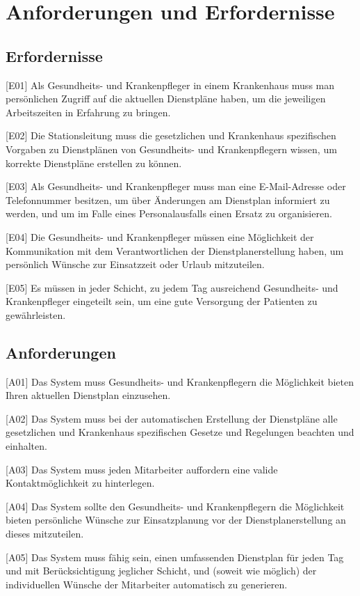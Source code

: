 \documentclass[10pt,a4paper]{article}
\begin{document}
\section{Anforderungen und Erfordernisse}
\subsection{Erfordernisse}
[E01] Als Gesundheits- und Krankenpfleger in einem Krankenhaus muss man persönlichen Zugriff auf die aktuellen Dienstpläne haben, um die jeweiligen Arbeitszeiten in Erfahrung zu bringen.

[E02] Die Stationsleitung muss die gesetzlichen und Krankenhaus spezifischen Vorgaben zu Dienstplänen von Gesundheits- und Krankenpflegern wissen, um korrekte Dienstpläne erstellen zu können.

[E03] Als Gesundheits- und Krankenpfleger muss man eine E-Mail-Adresse oder Telefonnummer besitzen, um über Änderungen am Dienstplan informiert zu werden, und um im Falle eines Personalausfalls einen Ersatz zu organisieren.

[E04] Die Gesundheits- und Krankenpfleger müssen eine Möglichkeit der Kommunikation mit dem Verantwortlichen der Dienstplanerstellung haben, um persönlich Wünsche zur Einsatzzeit oder Urlaub mitzuteilen.

[E05] Es müssen in jeder Schicht, zu jedem Tag ausreichend Gesundheits- und Krankenpfleger eingeteilt sein, um eine gute Versorgung der Patienten zu gewährleisten.
\subsection{Anforderungen}
[A01] Das System muss Gesundheits- und Krankenpflegern die Möglichkeit bieten Ihren aktuellen Dienstplan einzusehen.

[A02] Das System muss bei der automatischen Erstellung der Dienstpläne alle gesetzlichen und Krankenhaus spezifischen Gesetze und Regelungen beachten und einhalten.

[A03] Das System muss jeden Mitarbeiter auffordern eine valide Kontaktmöglichkeit zu hinterlegen.

[A04] Das System sollte den Gesundheits- und Krankenpflegern die Möglichkeit bieten persönliche Wünsche zur Einsatzplanung vor der Dienstplanerstellung an dieses mitzuteilen.

[A05] Das System muss fähig sein, einen umfassenden Dienstplan für jeden Tag und mit Berücksichtigung jeglicher Schicht, und (soweit wie möglich) der individuellen Wünsche der Mitarbeiter automatisch zu generieren.
\end{document}
